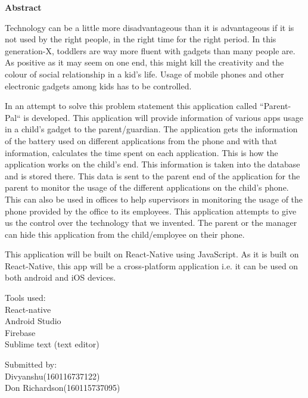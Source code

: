 \centerline{\LARGE \bfseries Abstract}
\vspace{0.25in}

\medskip
Technology can be a little more disadvantageous than it is advantageous if it is not used by the right
people, in the right time for the right period. In this generation-X, toddlers are way more fluent with
gadgets than many people are. As positive as it may seem on one end, this might kill the creativity
and the colour of social relationship in a kid’s life. Usage of mobile phones and other electronic
gadgets among kids has to be controlled.

\vspace{0.25in}

In an attempt to solve this problem statement this application called “Parent-Pal“ is
developed. This application will provide information of various apps usage in a child’s gadget to the
parent/guardian. The application gets the information of the battery used on different applications
from the phone and with that information, calculates the time spent on each application. This is how
the application works on the child’s end. This information is taken into the database and is stored
there. This data is sent to the parent end of the application for the parent to monitor the usage of
the different applications on the child’s phone. This can also be used in offices to help supervisors in
monitoring the usage of the phone provided by the office to its employees. This application attempts
to give us the control over the technology that we invented. The parent or the manager can hide
this application from the child/employee on their phone. 

\vspace{0.25in}

This application will be built on React-Native using JavaScript. As it is built on React-Native,
this app will be a cross-platform application i.e. it can be used on both android and iOS devices.

\vspace{0.5in}
\begin{flushleft}
\noindent Tools used:\\
React-native\\
Android Studio\\
Firebase\\
Sublime text (text editor)\\
\end{flushleft}
\begin{flushright}
\noindent Submitted by: \\
\noindent Divyanshu(160116737122)\\
\noindent Don Richardson(160115737095)\\
\end{flushright}

\vfill
\newpage